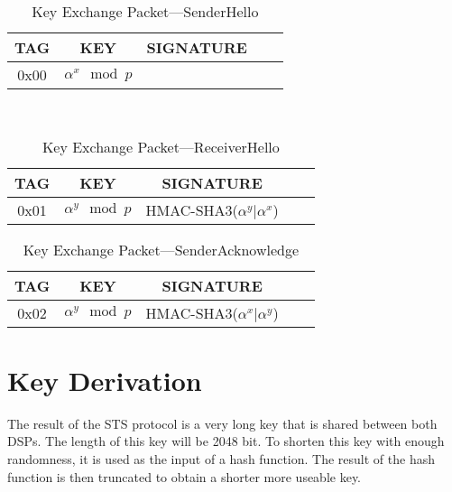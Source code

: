 \documentclass[a4paper]{article}
\begin{document}
\begin{table}[H]
    \begin{center}
        \begin{tabular}{| c | c | c | c | c |}
            \hline
            TAG & KEY & SIGNATURE \\ \hline
            0x00 & $\alpha^x\mod{p}$ & \\
            \hline
        \end{tabular}
    \end{center}
    \
    \caption{Key Exchange Packet---SenderHello}
    \label{tab:key_exchange_packet_senderhello}
\end{table}
\begin{table}[H]
    \begin{center}
        \begin{tabular}{| c | c | c | c | c |}
            \hline
            TAG & KEY & SIGNATURE \\ \hline
            0x01 & $\alpha^y\mod{p}$ & HMAC-SHA3($\alpha^y \big| \alpha^x$)\\
            \hline
        \end{tabular}
    \end{center}
    
    \caption{Key Exchange Packet---ReceiverHello}
    \label{tab:key_exchange_packet_receiverhello}
\end{table}
\begin{table}[H]
    \begin{center}
        \begin{tabular}{| c | c | c | c | c |}
            \hline
            TAG & KEY & SIGNATURE \\ \hline
            0x02 & $\alpha^y\mod{p}$ & HMAC-SHA3($\alpha^x \big| \alpha^y$)\\
            \hline
        \end{tabular}
    \end{center}
    
    \caption{Key Exchange Packet---SenderAcknowledge}
    \label{tab:key_exchange_packet_senderacknowledge}
\end{table}

\section{Key Derivation}
\label{sec:key_derivation}

The result of the STS protocol is a very long key that is shared between both DSPs. The length of this key will be 2048 bit. To shorten this key with enough randomness, it is used as the input of a hash function. The result of the hash function is then truncated to obtain a shorter more useable key.\\
\end{document}
